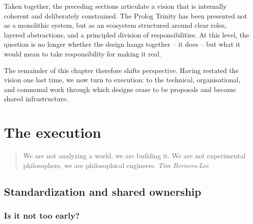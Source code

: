 
Taken together, the preceding sections articulate a vision that is internally coherent and deliberately constrained. The Prolog Trinity has been presented not as a monolithic system, but as an ecosystem structured around clear roles, layered abstractions, and a principled division of responsibilities. At this level, the question is no longer whether the design hangs together -- it does -- but what it would mean to take responsibility for making it real.

The remainder of this chapter therefore shifts perspective. Having restated the vision one last time, we now turn to execution: to the technical, organisational, and communal work through which designs cease to be proposals and become shared infrastructure.


\section{The execution}\label{sec:execution}

\begin{quotation}
\noindent We are not analyzing a world, we are building it. We are not experimental philosophers, we are philosophical engineers.
\vspace{-0.3cm}
\flushright\textit{Tim Berners-Lee}
\end{quotation}

\subsection{Standardization and shared ownership}\label{sec:standardization-shared-ownership}

\subsubsection{Is it not too early?}\label{sec:too-early-to-standardize}


